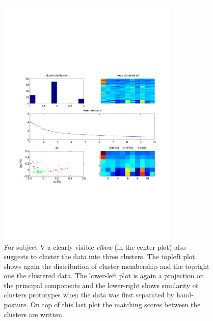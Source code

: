 \begin{figure}[ht]
    \centering
        \includegraphics[width=0.8\textwidth]{images/raw_clusters_vega.pdf}
    \caption{For subject V a clearly visible \emph{elbow} (in the center plot) also suggests to cluster the data into three clusters. The topleft plot shows again the distribution of cluster membership and the topright one the clustered data. The lower-left plot is again a projection on the principal components and the lower-right shows similarity of clusters prototypes when the data was first separated by hand-posture. On top of this last plot the matching scores between the clusters are written.}
    \label{sg:fig:Documents_uni_yifat_lab_results_evoked_syns_raw_clusters_vega}
\end{figure}


